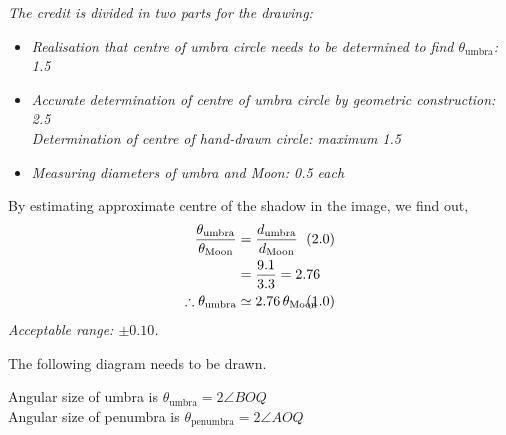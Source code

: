 \begin{description}
\emph{The credit is divided in two parts for the drawing:}
\begin{itemize}
\item \emph{Realisation that centre of umbra circle needs to be determined to find
$\theta_{\mathrm{umbra}}$: 1.5}
\item \emph{Accurate determination of centre of umbra circle by geometric construction: 2.5\\
Determination of centre of hand-drawn circle: maximum 1.5}
\item \emph{Measuring diameters of umbra and Moon: 0.5 each}
\end{itemize}

By estimating approximate centre of the shadow in the image, we find out,
\begin{align*}
\frac{\theta_{\mathrm{umbra}}}{\theta_{\mathrm{Moon}}}
 &= \frac{d_{\mathrm{umbra}}}{d_{\mathrm{Moon}}} & &\hspace{-2em}(2.0)\\
 &= \frac{9.1}{3.3} = 2.76\\
\therefore \theta_{\mathrm{umbra}} &\simeq 2.76\,\theta_{\mathrm{Moon}}
 & &\hspace{-2em}(1.0)
\end{align*}
\emph{Acceptable range: $\pm0.10$.}

\item[(D2.5)]
The following diagram needs to be drawn.

Angular size of umbra is $\theta_{\mathrm{umbra}} = 2\angle BOQ$\\
Angular size of penumbra is $\theta_{\mathrm{penumbra}} = 2\angle AOQ$


\end{description}
